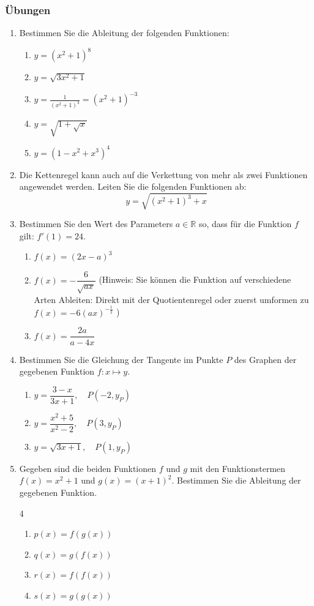 \clearpage
\subsubsection{Übungen}
\begin{enumerate}
    \item Bestimmen Sie die Ableitung der folgenden Funktionen:
          \begin{enumerate}
              \item $y = (x^2+1)^8$
              \item $y = \sqrt{3x^2+1}$
              \item $y= \frac{1}{(x^2+1)^3}= (x^2+1)^{-3}$
              \item $y=\sqrt{1+\sqrt{x}}$
              \item $y=(1-x^2+x^3)^4$
          \end{enumerate}
    \item Die Kettenregel kann auch auf die Verkettung von mehr als zwei Funktionen angewendet werden. Leiten Sie die folgenden Funktionen ab:
          $$y = \sqrt{(x^2+1)^3+x}$$
    \item Bestimmen Sie den Wert des Parameters \( a \in \mathbb{R} \) so, dass für die Funktion \( f \) gilt: \( f'(1) = 24 \).
          \begin{enumerate}
              \item \( f(x) = (2x - a)^3 \)
              \item \( f(x) = -\dfrac{6}{\sqrt{a x}} \) (Hinweis: Sie können die Funktion auf verschiedene Arten Ableiten: Direkt mit der Quotientenregel oder zuerst umformen zu $f(x) = -6 (ax)^{-\frac{1}{2}}$ )
              \item \( f(x) = \dfrac{2a}{a - 4x} \)
          \end{enumerate}


    \item Bestimmen Sie die Gleichung der Tangente im Punkte \( P \) des Graphen der gegebenen Funktion \( f\colon x \mapsto y \).
          \begin{enumerate}
              \item \( y = \dfrac{3 - x}{3x + 1}, \quad P(-2 , y_P) \)
              \item \( y = \dfrac{x^2 + 5}{x^2 - 2}, \quad P(3 , y_P) \)
              \item \( y = \sqrt{3x + 1}, \quad P(1 ,  y_P) \)
          \end{enumerate}

    \item Gegeben sind die beiden Funktionen $f$ und $g$ mit den Funktionstermen $f(x)=x^2+1$ und $g(x)=(x+1)^2$. Bestimmen Sie die Ableitung der gegebenen Funktion.
    \begin{multicols}{4}
        \begin{enumerate}
            \item $p(x)=f(g(x))$
            \item $q(x)=g(f(x))$
            \item $r(x)=f(f(x))$
            \item $s(x)=g(g(x))$
        \end{enumerate}
    \end{multicols}


\end{enumerate}
